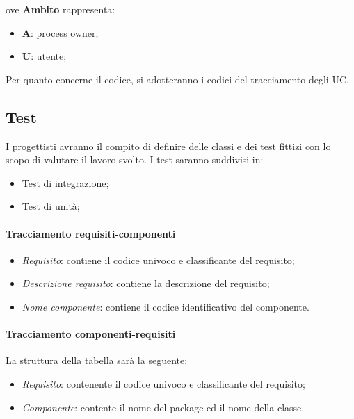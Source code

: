 ove \textbf{Ambito} rappresenta:
\begin{itemize}
\item \textbf{A}: process owner;
\item \textbf{U}: utente;
\end{itemize}

Per quanto concerne il codice, si adotteranno i codici del tracciamento degli UC.

\subsection{Test} I progettisti avranno il compito di definire delle classi e dei test fittizi con lo scopo di valutare il lavoro svolto.
I test saranno suddivisi in:
\begin{itemize}
\item Test di integrazione;
\item Test di unità;
\end{itemize}

\paragraph{Tracciamento requisiti-componenti}

\begin{itemize}
\item \textit{Requisito}: contiene il codice univoco e classificante del requisito;
\item \textit{Descrizione requisito}: contiene la descrizione del requisito;
\item \textit{Nome componente}: contiene il codice identificativo del componente.
\end{itemize}

\paragraph{Tracciamento componenti-requisiti}
La struttura della tabella sarà la seguente:
\begin{itemize}
\item \textit{Requisito}: contenente il codice univoco e classificante del requisito;
\item \textit{Componente}: contente il nome del package ed il nome della classe.
\end{itemize}

